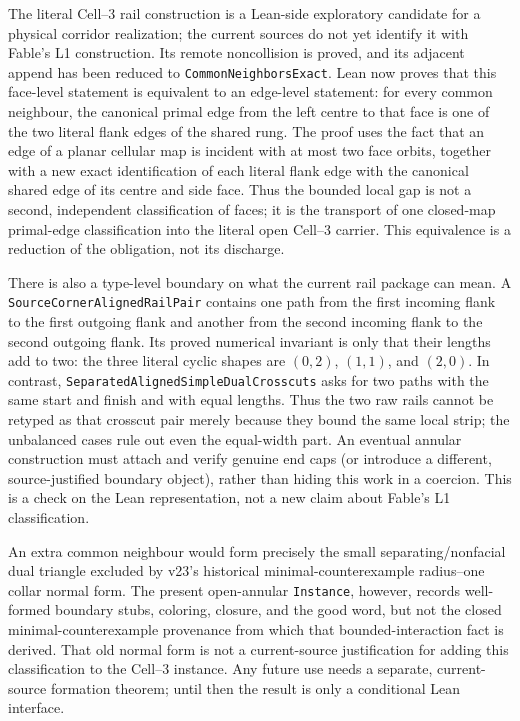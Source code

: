 \documentclass[11pt]{article}
\theoremstyle{definition}
\begin{document}
The literal Cell--3 rail construction is a Lean-side exploratory candidate
for a physical corridor realization; the current sources do not yet identify
it with Fable's L1 construction.
Its remote noncollision is proved, and its adjacent append has been reduced to
\texttt{CommonNeighborsExact}.  Lean now proves that this face-level statement
is equivalent to an edge-level statement: for every common neighbour, the
canonical primal edge from the left centre to that face is one of the two
literal flank edges of the shared rung.  The proof uses the fact that an edge
of a planar cellular map is incident with at most two face orbits, together
with a new exact identification of each literal flank edge with the canonical
shared edge of its centre and side face.  Thus the bounded local gap is not a
second, independent classification of faces; it is the transport of one
closed-map primal-edge classification into the literal open Cell--3 carrier.
This equivalence is a reduction of the obligation, not its discharge.

There is also a type-level boundary on what the current rail package can
mean.  A
\texttt{SourceCornerAlignedRailPair} contains one path from the first
incoming flank to the first outgoing flank and another from the second
incoming flank to the second outgoing flank.  Its proved numerical invariant
is only that their lengths add to two: the three literal cyclic shapes are
$(0,2)$, $(1,1)$, and $(2,0)$.  In contrast,
\texttt{SeparatedAlignedSimpleDualCrosscuts} asks for two paths with the
same start and finish and with equal lengths.  Thus the two raw rails cannot
be retyped as that crosscut pair merely because they bound the same local
strip; the unbalanced cases rule out even the equal-width part.  An eventual
annular construction must attach and verify genuine end caps (or introduce a
different, source-justified boundary object), rather than hiding this work in
a coercion.  This is a check on the Lean representation, not a new claim
about Fable's L1 classification.

An extra common neighbour would form precisely
the small separating/nonfacial dual triangle excluded by v23's
historical minimal-counterexample radius--one collar normal form.  The present open-annular
\texttt{Instance}, however, records well-formed boundary stubs, coloring,
closure, and the good word, but not the closed minimal-counterexample
provenance from which that bounded-interaction fact is derived.  That old
normal form is not a current-source justification for adding this
classification to the Cell--3 instance.  Any future use needs a separate,
current-source formation theorem; until then the result is only a conditional
Lean interface.
\end{document}
